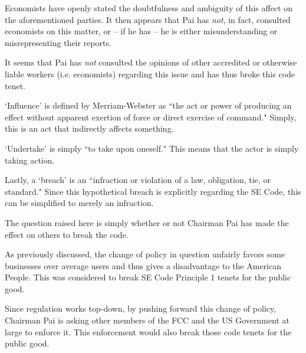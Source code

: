 \documentclass[12pt]{article}
\begin{document}
\begin{multicols}{2}
  Economists have openly stated the doubtfulness and ambiguity of this affect on the aforementioned parties.\cite{ieee-article} It then appears that Pai has \textit{not}, in fact, consulted economists on this matter, or -- if he has -- he is either misunderstanding or misrepresenting their reports.
  
  It seems that Pai has \textit{not} consulted the opinions of other accredited or otherwise liable workers (i.e. economists) regarding this issue and has thus broke this code tenet.
  
  
  `Influence' is defined by Merriam-Webster as ``the act or power of producing an effect without apparent exertion of force or direct exercise of command." Simply, this is an act that indirectly affects something.
  
  `Undertake' is simply ``to take upon oneself."\cite{webster} This means that the actor is simply taking action.
  
  Lastly, a `breach' is an ``infraction or violation of a law, obligation, tie, or standard."\cite{webster} Since this hypothetical breach is explicitly regarding the SE Code, this can be simplified to merely an infraction.
  
  
  The question raised here is simply whether or not Chairman Pai has made the effect on others to break the code.
  
  As previously discussed, the change of policy in question unfairly favors some businesses over average users and thus gives a disadvantage to the American People. This was considered to break SE Code Principle 1 tenets for the public good.
  
  Since regulation works top-down, by pushing forward this change of policy, Chairman Pai is asking other members of the FCC and the US Government at large to enforce it. This enforcement would also break those code tenets for the public good.
  

\end{multicols}
\end{document}
